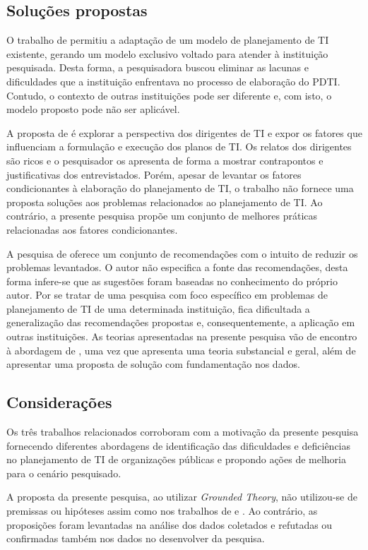 \subsection{Soluções propostas}
O trabalho de  permitiu a adaptação de um modelo de planejamento de TI existente, gerando um modelo exclusivo voltado para atender à instituição pesquisada. Desta forma, a pesquisadora buscou eliminar as lacunas e dificuldades que a instituição enfrentava no processo de elaboração do PDTI. Contudo, o contexto de outras instituições pode ser diferente e, com isto, o modelo proposto pode não ser aplicável.

A proposta de  é explorar a perspectiva dos dirigentes de TI e expor os fatores que influenciam a formulação e execução dos planos de TI. Os relatos dos dirigentes são ricos e o pesquisador os apresenta de forma a mostrar contrapontos e justificativas dos entrevistados. Porém, apesar de levantar os fatores condicionantes à elaboração do planejamento de TI, o trabalho não fornece uma proposta soluções aos problemas relacionados ao planejamento de TI. Ao contrário, a presente pesquisa propõe um conjunto de melhores práticas relacionadas aos fatores condicionantes.

A pesquisa de  oferece um conjunto de recomendações com o intuito de reduzir os problemas levantados. O autor não especifica a fonte das recomendações, desta forma infere-se que as sugestões foram baseadas no conhecimento do próprio autor. Por se tratar de uma pesquisa com foco específico em problemas de planejamento de TI de uma determinada instituição, fica dificultada a generalização das recomendações propostas e, consequentemente, a aplicação em outras instituições. As teorias apresentadas na presente pesquisa vão de encontro à abordagem de , uma vez que apresenta uma teoria substancial e geral, além de apresentar uma proposta de solução com fundamentação nos dados.

\subsection{Considerações}
Os três trabalhos relacionados corroboram com a motivação da presente pesquisa fornecendo diferentes abordagens de identificação das dificuldades e deficiências no planejamento de TI de organizações públicas e propondo ações de melhoria para o cenário pesquisado.

A proposta da presente pesquisa, ao utilizar \textit{Grounded Theory}, não utilizou-se de premissas ou hipóteses assim como nos trabalhos de  e . Ao contrário, as proposições foram levantadas na análise dos dados coletados e refutadas ou confirmadas também nos dados no desenvolver da pesquisa.

